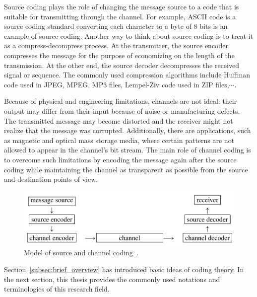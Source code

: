 Source coding plays the role of changing the message source to a code that is suitable for transmitting through the channel. For example, ASCII code is a source coding standard converting each character to a byte of 8 bits is an example of source coding. Another way to think about source coding is to treat it as a compress-decompress process. At the transmitter, the source encoder compresses the message for the purpose of economizing on the length of the transmission. At the other end, the source decoder decompresses the received signal or sequence. The commonly used compression algorithms include Huffman code used in JPEG, MPEG, MP3 files, Lempel-Ziv code used in ZIP files,$\cdots$.

Because of physical and engineering limitations, channels are not ideal: their output may differ from their input because of noise or manufacturing defects. The transmitted message may become distorted and the receiver might not realize that the message was corrupted. Additionally, there are applications, such as magnetic and optical mass storage media, where certain patterns are not allowed to appear in the channel's bit stream. The main role of channel coding is to overcome such limitations by encoding the message again after the source coding while maintaining the channel as transparent as possible from the source and destination points of view. 

\begin{figure}
    \centering
    \includegraphics[scale=0.5]{fig/sourceandchannelcoding.png}
    \caption{Model of source and channel coding~\cite{ling2004coding}.}
    \label{fig:sourcechannelcoding}
\end{figure}

Section~\ref{subsec:brief_overview} has introduced basic ideas of coding theory. In the next section, this thesis provides the commonly used notations and terminologies of this research field.
